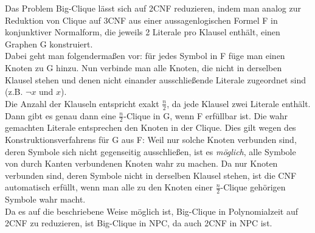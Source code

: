 \documentclass[fleqn]{article}
\begin{document}
Das Problem Big-Clique lässt sich auf 2CNF reduzieren, indem man analog zur Reduktion von Clique auf 3CNF aus einer aussagenlogischen Formel F in konjunktiver Normalform, die jeweils 2 Literale pro Klausel enthält, einen Graphen G konstruiert.\\
Dabei geht man folgendermaßen vor: für jedes Symbol in F füge man einen Knoten zu G hinzu. Nun verbinde man alle Knoten, die nicht in derselben Klausel stehen und denen nicht einander ausschließende Literale zugeordnet sind (z.B. $\neg x$ und $x$).\\
Die Anzahl der Klauseln entspricht exakt $\frac{n}{2}$, da jede Klausel zwei Literale enthält.\\
Dann gibt es genau dann eine $\frac{n}{2}$-Clique in G, wenn F erfüllbar ist. Die wahr gemachten Literale entsprechen den Knoten in der Clique. Dies gilt wegen des Konstruktionsverfahrens für G aus F: Weil nur solche Knoten verbunden sind, deren Symbole sich nicht gegenseitig ausschließen, ist es \textit{möglich}, alle Symbole von durch Kanten verbundenen Knoten wahr zu machen. Da nur Knoten verbunden sind, deren Symbole nicht in derselben Klausel stehen, ist die CNF automatisch erfüllt, wenn man alle zu den Knoten einer $\frac{n}{2}$-Clique gehörigen Symbole wahr macht.\\
Da es auf die beschriebene Weise möglich ist, Big-Clique in Polynomialzeit auf 2CNF zu reduzieren, ist Big-Clique in NPC, da auch 2CNF in NPC ist.
\end{document}
